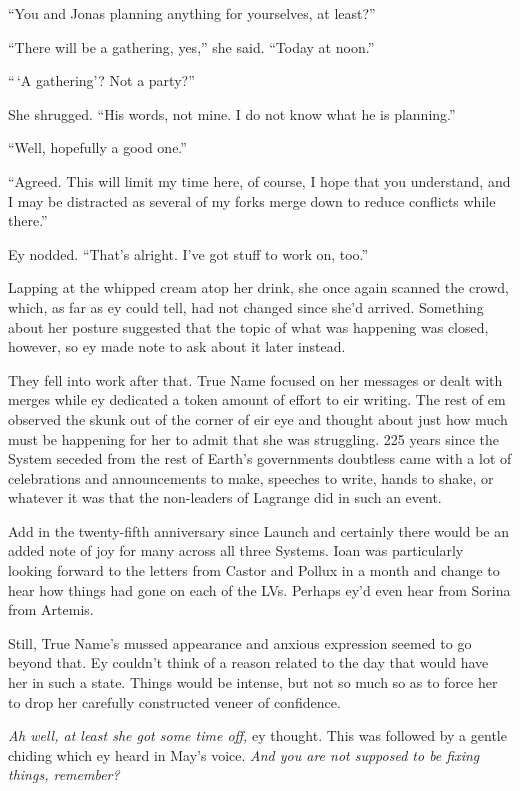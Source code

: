 ``You and Jonas planning anything for yourselves, at least?''

``There will be a gathering, yes,'' she said. ``Today at noon.''

``\,`A gathering'? Not a party?''

She shrugged. ``His words, not mine. I do not know what he is planning.''

``Well, hopefully a good one.''

``Agreed. This will limit my time here, of course, I hope that you understand, and I may be distracted as several of my forks merge down to reduce conflicts while there.''

Ey nodded. ``That's alright. I've got stuff to work on, too.''

Lapping at the whipped cream atop her drink, she once again scanned the crowd, which, as far as ey could tell, had not changed since she'd arrived. Something about her posture suggested that the topic of what was happening was closed, however, so ey made note to ask about it later instead.

They fell into work after that. True Name focused on her messages or dealt with merges while ey dedicated a token amount of effort to eir writing. The rest of em observed the skunk out of the corner of eir eye and thought about just how much must be happening for her to admit that she was struggling. 225 years since the System seceded from the rest of Earth's governments doubtless came with a lot of celebrations and announcements to make, speeches to write, hands to shake, or whatever it was that the non-leaders of Lagrange did in such an event.

Add in the twenty-fifth anniversary since Launch and certainly there would be an added note of joy for many across all three Systems. Ioan was particularly looking forward to the letters from Castor and Pollux in a month and change to hear how things had gone on each of the LVs. Perhaps ey'd even hear from Sorina from Artemis.

Still, True Name's mussed appearance and anxious expression seemed to go beyond that. Ey couldn't think of a reason related to the day that would have her in such a state. Things would be intense, but not so much so as to force her to drop her carefully constructed veneer of confidence.

\emph{Ah well, at least she got some time off,} ey thought. This was followed by a gentle chiding which ey heard in May's voice. \emph{And you are not supposed to be fixing things, remember?}


